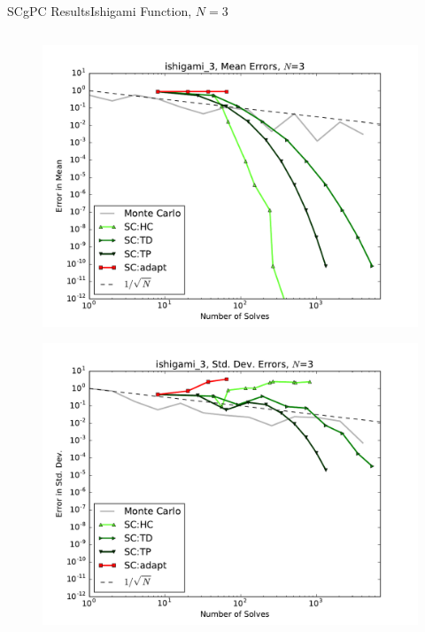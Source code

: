 \documentclass{beamer}
\begin{document}
\begin{frame}{SCgPC Results}{Ishigami Function, $N=3$}
\begin{columns}
\begin{column}{0.5\textwidth}
\begin{figure}[h!]
          \includegraphics[width=0.8\linewidth]{anlmodels/ishigami_3_mean_errs_nohdmr}
        \end{figure}
        \vspace{-20pt}
        \begin{figure}[h!]
          \centering
          \includegraphics[width=0.8\linewidth]{anlmodels/ishigami_3_variance_errs_nohdmr}
        \end{figure}
   \end{column}
 \end{columns}
\end{frame}
\end{document}
